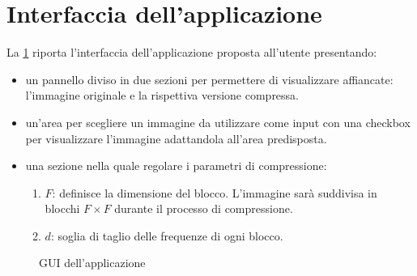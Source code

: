 \documentclass[11pt,italian]{article}
\begin{document}
\section{Interfaccia dell'applicazione}
La \cref{fig:application-window} riporta l'interfaccia dell'applicazione proposta all'utente presentando:
\begin{itemize}
    \item un pannello diviso in due sezioni per permettere di visualizzare affiancate: l'immagine originale e la rispettiva versione compressa.
    \item un'area per scegliere un immagine da utilizzare come input con una checkbox per visualizzare l'immagine adattandola all'area predisposta.
    \item una sezione nella quale regolare i parametri di compressione:
    \begin{enumerate}
        \item $F$: definisce la dimensione del blocco. L'immagine sarà suddivisa in blocchi $F\times F$ durante il processo di compressione.
        \item $d$: soglia di taglio delle frequenze di ogni blocco.
    \end{enumerate}
\end{itemize}

\begin{figure}[H]
    \caption{GUI dell'applicazione}
    \label{fig:application-window}
\end{figure}
\end{document}
